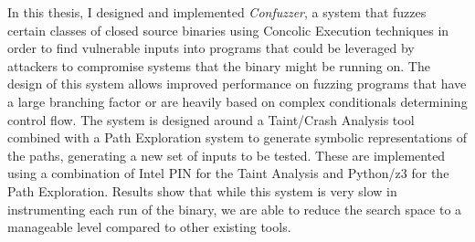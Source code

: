 In this thesis, I designed and implemented \textit{Confuzzer}, a system that
fuzzes certain classes of closed source binaries using Concolic Execution
techniques in order to find vulnerable inputs into programs that could be
leveraged by attackers to compromise systems that the binary might be running
on. The design of this system allows improved performance on fuzzing programs
that have a large branching factor or are heavily based on complex conditionals
determining control flow. The system is designed around a Taint/Crash Analysis
tool combined with a Path Exploration system to generate symbolic
representations of the paths, generating a new set of inputs to be tested. These
are implemented using a combination of Intel PIN for the Taint Analysis and
Python/z3 for the Path Exploration. Results show that while this system is very
slow in instrumenting each run of the binary, we are able to reduce the search
space to a manageable level compared to other existing tools.
